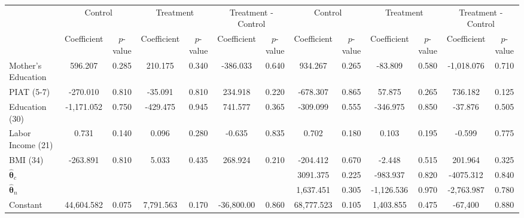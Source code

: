 \begin{tabular}{lcccccccccccc} \toprule
&\multicolumn{2}{c}{Control} & \multicolumn{2}{c}{Treatment} & \multicolumn{2}{c}{Treatment - Control} & \multicolumn{2}{c}{Control} & \multicolumn{2}{c}{Treatment} & \multicolumn{2}{c}{Treatment - Control} \\
 & Coefficient  & $p$-value  & Coefficient  & $p$-value & Coefficient  & $p$-value  & Coefficient  & $p$-value  & Coefficient  & $p$-value  & Coefficient  & $p$-value \\ \midrule
Mother's Education &   596.207 &     0.285 &   210.175 &     0.340 &  -386.033 &     0.640 &   934.267 &     0.265 &   -83.809 &     0.580 & -1,018.076 &     0.710 \\  
PIAT (5-7) &  -270.010 &     0.810 &   -35.091 &     0.810 &   234.918 &     0.220 &  -678.307 &     0.865 &    57.875 &     0.265 &   736.182 &     0.125 \\  
Education (30) & -1,171.052 &     0.750 &  -429.475 &     0.945 &   741.577 &     0.365 &  -309.099 &     0.555 &  -346.975 &     0.850 &   -37.876 &     0.505 \\  
Labor Income (21) &     0.731 &     0.140 &     0.096 &     0.280 &    -0.635 &     0.835 &     0.702 &     0.180 &     0.103 &     0.195 &    -0.599 &     0.775 \\  
BMI (34) &  -263.891 &     0.810 &     5.033 &     0.435 &   268.924 &     0.210 &  -204.412 &     0.670 &    -2.448 &     0.515 &   201.964 &     0.325 \\  
$\hat{\bm{\theta}}_{c}$ &         &         &         &         &         &         &  3091.375 &     0.225 &  -983.937 &     0.820 & -4075.312 &     0.840 \\  
$\hat{\bm{\theta}}_{n}$ &         &         &         &         &         &         &  1,637.451 &     0.305 & -1,126.536 &     0.970 & -2,763.987 &     0.780 \\  
Constant & 44,604.582 &     0.075 &  7,791.563 &     0.170 & -36,800.00 &     0.860 & 68,777.523 &     0.105 &  1,403.855 &     0.475 & -67,400 &     0.880 \\  
\bottomrule \end{tabular}
